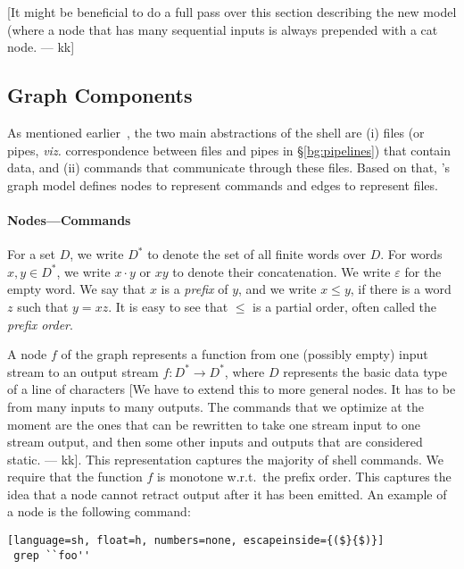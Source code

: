 \documentclass[sigplan,10pt,review,anonymous]{acmart}
\newcommand{\kk}[1]{[{\color{magenta}#1 --- kk}]}
\newcommand{\kstar}{^{\textstyle *}}
\newcommand{\eps}{\varepsilon}
\begin{document}
\kk{It might be beneficial to do a full pass over this section
  describing the new model (where a node that has many sequential
  inputs is always prepended with a cat node.}

\subsection{Graph Components}
\label{graph-components}

As mentioned earlier~, the two main abstractions of
the shell are (i) files (or pipes, \emph{viz.} correspondence between
files and pipes in \S\ref{bg:pipelines}) that contain data, and (ii)
commands that communicate through these files. Based on that, \sys's
graph model defines nodes to represent commands and edges to represent
files.

\paragraph{Nodes---Commands}

For a set $D$, we write $D\kstar$ to denote the set of all finite
words over $D$. For words $x, y \in D\kstar$, we write $x \cdot y$ or
$xy$ to denote their concatenation. We write $\eps$ for the empty
word. We say that $x$ is a \emph{prefix} of $y$, and we write $x \leq
y$, if there is a word $z$ such that $y = xz$. It is easy to see that
$\leq$ is a partial order, often called the \emph{prefix order}.

A node $f$ of the graph represents a function from one (possibly
empty) input stream to an output stream $f : D\kstar \to D\kstar$,
where $D$ represents the basic data type of a line of characters
\kk{We have to extend this to more general nodes. It has to be from
  many inputs to many outputs. The commands that we optimize at the
  moment are the ones that can be rewritten to take one stream input
  to one stream output, and then some other inputs and outputs that
  are considered static.}. This representation captures the majority
of shell commands. We require that the function $f$ is monotone
w.r.t.\ the prefix order. This captures the idea that a node cannot
retract output after it has been emitted.
An example of a node is the following command:

\begin{lstlisting}[language=sh, float=h, numbers=none, escapeinside={($}{$)}]
 grep ``foo''
\end{lstlisting}
\end{document}
